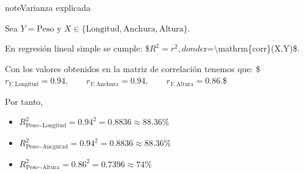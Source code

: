 \documentclass[a4paper,10pt,spanish]{jupyterBook}
\begin{document}
\begin{sphinxadmonition}{note}{Varianza explicada}

\sphinxAtStartPar
Sea \(Y=\text{Peso}\) y \(X\in\{\text{Longitud},\text{Anchura},\text{Altura}\}\).

\sphinxAtStartPar
En regresión lineal simple se cumple:
\$\(
R^2 = r^2,
\)\(
donde \)r=\textbackslash{}mathrm\{corr\}(X,Y)\$.

\sphinxAtStartPar
Con los valores obtenidos en la matriz de correlación tenemos que:
\$\(
r_{Y,\text{Longitud}}=0.94,\qquad
r_{Y,\text{Anchura}}=0.94,\qquad
r_{Y,\text{Altura}}=0.86.
\)\$

\sphinxAtStartPar
Por tanto,
\begin{itemize}
\item {}
\sphinxAtStartPar
\(R^2_{\text{Peso}\sim\text{Longitud}} = 0.94^2 = 0.8836 \approx 88.36\%\)

\item {}
\sphinxAtStartPar
\(R^2_{\text{Peso}\sim\text{Ancgurad}} = 0.94^2 = 0.8836 \approx 88.36\%\)

\item {}
\sphinxAtStartPar
\(R^2_{\text{Peso}\sim\text{Altura}} = 0.86^2 = 0.7396 \approx 74\%\)

\end{itemize}
\end{sphinxadmonition}

\sphinxstepscope
\end{document}
